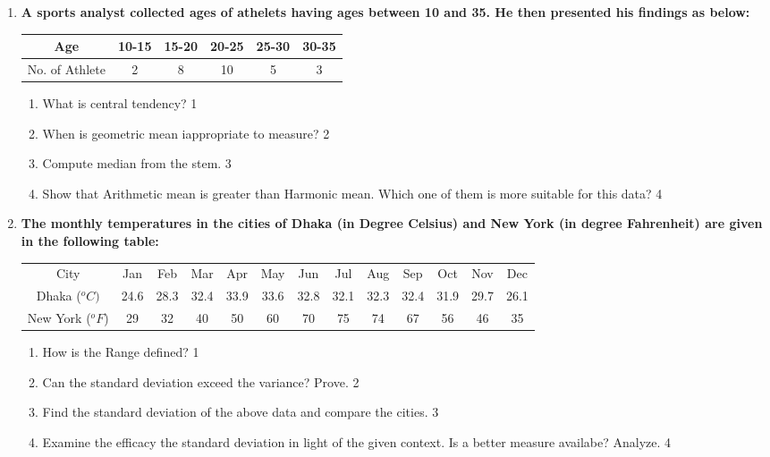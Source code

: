 \documentclass[a4paper,oneside]{book}
\begin{document}
\begin{enumerate}
  
     \item
	  \textbf{A sports analyst collected ages of athelets having ages between 10 and 35. He then presented his findings as below:} 
	  
	  \begin{table}[h]
	    \centering
\begin{tabular}{c|c|c|c|c|c}
Age            & 10-15 & 15-20 & 20-25 & 25-30 & 30-35 \\ \hline
No. of Athlete & 2     & 8     & 10    & 5     & 3    
\end{tabular}
\end{table}
  
  \begin{enumerate}
    \item
	What is central tendency? \hfill 1
    \item
	When is geometric mean iappropriate to measure? \hfill 2
    \item  
	Compute median from the stem. \hfill 3
    \item
	Show that Arithmetic mean is greater than Harmonic mean. Which one of them is more suitable for this data? \hfill 4
  \end{enumerate}
  
   \item
  \textbf{The monthly temperatures in the cities of Dhaka (in Degree Celsius) and New York (in degree Fahrenheit) are given in the following table:}
  
\begin{table}[h]
\centering
\begin{tabular}{ccccccccccccc}
City             & Jan  & Feb  & Mar  & Apr  & May  & Jun  & Jul  & Aug  & Sep  & Oct  & Nov  & Dec  \\
Dhaka ($^o C)$   & 24.6 & 28.3 & 32.4 & 33.9 & 33.6 & 32.8 & 32.1 & 32.3 & 32.4 & 31.9 & 29.7 & 26.1 \\
New York ($^oF$) & 29   & 32   & 40   & 50   & 60   & 70   & 75   & 74   & 67   & 56   & 46   & 35  
\end{tabular}
\end{table}

  
  \begin{enumerate}
    \item
	How is the Range defined? \hfill 1
    \item
	Can the standard deviation exceed the variance? Prove. \hfill 2
    \item  
	Find the standard deviation of the above data and compare the cities. \hfill 3
    \item
	Examine the efficacy the standard deviation in light of the given context. Is a better measure availabe? Analyze. \hfill 4
  \end{enumerate}


\end{enumerate}
\end{document}
